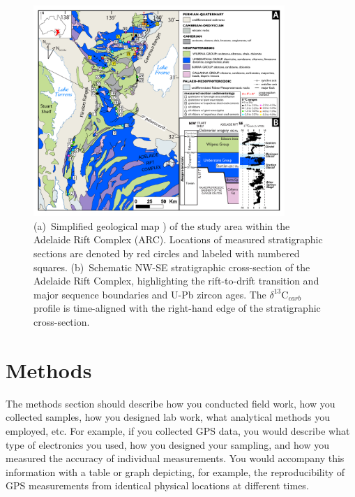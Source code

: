 \documentclass[11pt]{report}
\begin{document}
\begin{figure}[h!]
\centering
\includegraphics[width=0.85\textwidth]{Figures/example-map.pdf}
\caption[Short title for this figure that fits on a line]{\small{(a)~Simplified geological map \citep[adapted from][]{Preiss2002a}) of the study area within the Adelaide Rift Complex (ARC). Locations of measured stratigraphic sections are denoted by red circles and labeled with numbered squares. (b)~Schematic NW-SE stratigraphic cross-section of the Adelaide Rift Complex, highlighting the rift-to-drift transition and major sequence boundaries and U-Pb zircon ages. The $\delta^{13}$C$_{carb}$ profile \citep[adapted from][]{Halverson2005a} is time-aligned with the right-hand edge of the stratigraphic cross-section.}} 
\label{fig:map}
\end{figure}

\section{Methods \label{sec:methods}}
The methods section should describe how you conducted field work, how you collected samples, how you designed lab work, what analytical methods you employed, etc. For example, if you collected GPS data, you would describe what type of electronics you used, how you designed your sampling, and how you measured the accuracy of individual measurements. You would accompany this information with a table or graph depicting, for example, the reproducibility of GPS measurements from identical physical locations at different times.
\end{document}

